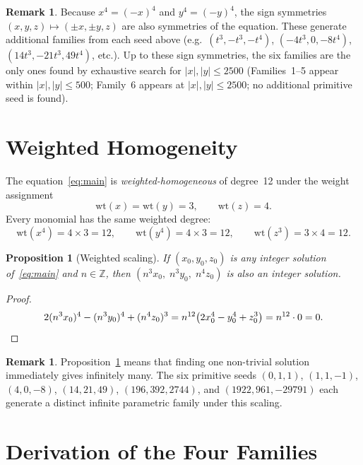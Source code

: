 \documentclass[12pt,a4paper]{article}
\newtheorem{proposition}[theorem]{Proposition}
\theoremstyle{definition}
\newtheorem{remark}[theorem]{Remark}
\newcommand{\Z}{\mathbb{Z}}
\begin{document}
\begin{remark}
  Because $x^4 = (-x)^4$ and $y^4 = (-y)^4$, the sign symmetries $(x,y,z)\mapsto(\pm x, \pm y, z)$
  are also symmetries of the equation.
  These generate additional families from each seed above (e.g.\ $(t^3,-t^3,-t^4)$,
  $(-4t^3, 0, -8t^4)$, $(14t^3,-21t^3,49t^4)$, etc.).
  Up to these sign symmetries, the six families are the only ones found by exhaustive
  search for $|x|, |y| \le 2500$ (Families~1--5 appear within $|x|,|y|\le 500$;
  Family~6 appears at $|x|,|y|\le 2500$; no additional primitive seed is found).
\end{remark}

\section{Weighted Homogeneity}\label{sec:homogeneity}

The equation~\eqref{eq:main} is \emph{weighted-homogeneous} of degree~12 under the
weight assignment
\[
  \mathrm{wt}(x) = \mathrm{wt}(y) = 3, \qquad \mathrm{wt}(z) = 4.
\]
Every monomial has the same weighted degree:
\[
  \mathrm{wt}(x^4) = 4\times 3 = 12, \qquad
  \mathrm{wt}(y^4) = 4\times 3 = 12, \qquad
  \mathrm{wt}(z^3) = 3\times 4 = 12.
\]

\begin{proposition}[Weighted scaling]\label{prop:scaling}
  If $(x_0, y_0, z_0)$ is any integer solution of~\eqref{eq:main} and $n \in \Z$, then
  $(n^3 x_0,\; n^3 y_0,\; n^4 z_0)$ is also an integer solution.
\end{proposition}
\begin{proof}
  \[
    2(n^3 x_0)^4 - (n^3 y_0)^4 + (n^4 z_0)^3
    = n^{12}\bigl(2x_0^4 - y_0^4 + z_0^3\bigr)
    = n^{12} \cdot 0 = 0. \qedhere
  \]
\end{proof}

\begin{remark}
  Proposition~\ref{prop:scaling} means that finding one non-trivial solution
  immediately gives infinitely many.  The six primitive seeds
  $(0,1,1)$, $(1,1,-1)$, $(4,0,-8)$, $(14,21,49)$, $(196,392,2744)$, and
  $(1922,961,-29791)$ each generate a distinct infinite parametric family under
  this scaling.
\end{remark}

\section{Derivation of the Four Families}\label{sec:families}
\end{document}
